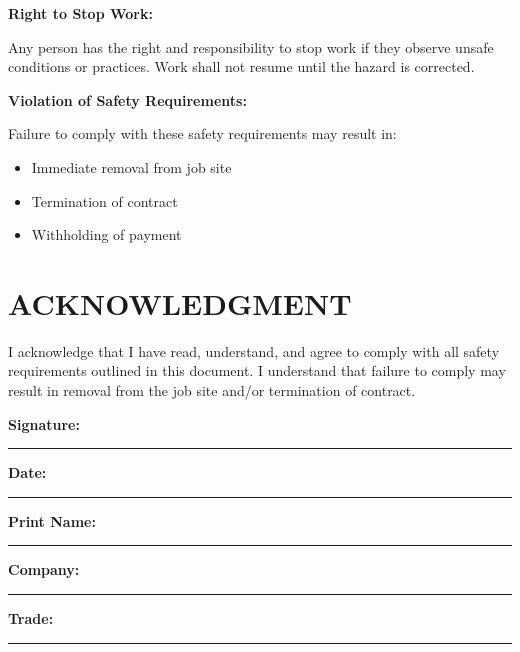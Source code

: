 \documentclass[11pt,letterpaper]{article}
\begin{document}
\vspace{6pt}

\textbf{Right to Stop Work:}

Any person has the right and responsibility to stop work if they observe unsafe conditions or practices. Work shall not resume until the hazard is corrected.

\vspace{6pt}

\textbf{Violation of Safety Requirements:}

Failure to comply with these safety requirements may result in:
\begin{itemize}[leftmargin=0.75in]
\item Immediate removal from job site
\item Termination of contract
\item Withholding of payment
\end{itemize}

\vspace{12pt}

\section*{ACKNOWLEDGMENT}

I acknowledge that I have read, understand, and agree to comply with all safety requirements outlined in this document. I understand that failure to comply may result in removal from the job site and/or termination of contract.

\vspace{12pt}

\textbf{Signature:} \rule{6cm}{0.4pt} \textbf{Date:} \rule{3cm}{0.4pt}

\textbf{Print Name:} \rule{6cm}{0.4pt}

\textbf{Company:} \rule{6cm}{0.4pt}

\textbf{Trade:} \rule{6cm}{0.4pt}
\end{document}

